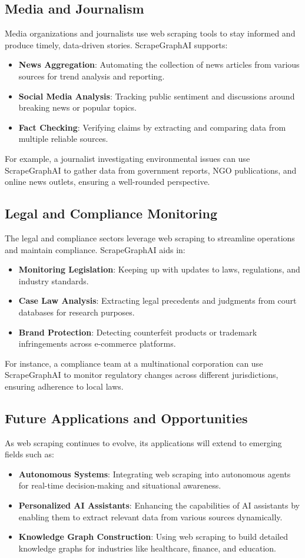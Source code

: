 \subsection{Media and Journalism}
Media organizations and journalists use web scraping tools to stay informed and produce timely, data-driven stories. ScrapeGraphAI supports:
\begin{itemize}
    \item \textbf{News Aggregation}: Automating the collection of news articles from various sources for trend analysis and reporting.
    \item \textbf{Social Media Analysis}: Tracking public sentiment and discussions around breaking news or popular topics.
    \item \textbf{Fact Checking}: Verifying claims by extracting and comparing data from multiple reliable sources.
\end{itemize}
For example, a journalist investigating environmental issues can use ScrapeGraphAI to gather data from government reports, NGO publications, and online news outlets, ensuring a well-rounded perspective.

\subsection{Legal and Compliance Monitoring}
The legal and compliance sectors leverage web scraping to streamline operations and maintain compliance. ScrapeGraphAI aids in:
\begin{itemize}
    \item \textbf{Monitoring Legislation}: Keeping up with updates to laws, regulations, and industry standards.
    \item \textbf{Case Law Analysis}: Extracting legal precedents and judgments from court databases for research purposes.
    \item \textbf{Brand Protection}: Detecting counterfeit products or trademark infringements across e-commerce platforms.
\end{itemize}
For instance, a compliance team at a multinational corporation can use ScrapeGraphAI to monitor regulatory changes across different jurisdictions, ensuring adherence to local laws.

\subsection{Future Applications and Opportunities}
As web scraping continues to evolve, its applications will extend to emerging fields such as:
\begin{itemize}
    \item \textbf{Autonomous Systems}: Integrating web scraping into autonomous agents for real-time decision-making and situational awareness.
    \item \textbf{Personalized AI Assistants}: Enhancing the capabilities of AI assistants by enabling them to extract relevant data from various sources dynamically.
    \item \textbf{Knowledge Graph Construction}: Using web scraping to build detailed knowledge graphs for industries like healthcare, finance, and education.
\end{itemize}

